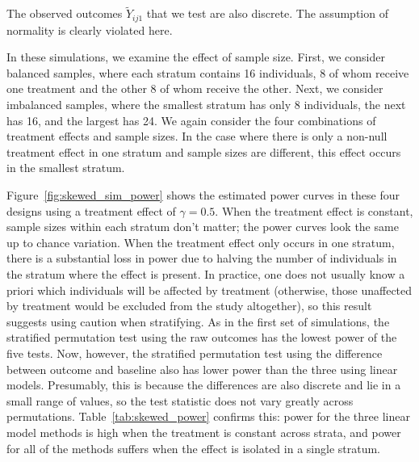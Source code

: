 \documentclass[11pt]{article}
\begin{document}
The observed outcomes $\tilde{Y}_{ij1}$ that we test are also discrete.
The assumption of normality is clearly violated here.

In these simulations, we examine the effect of sample size.
First, we consider balanced samples, where each stratum contains 16 individuals, 8 of whom receive one treatment and the other 8 of whom receive the other.
Next, we consider imbalanced samples, where the smallest stratum has only 8 individuals, the next has 16, and the largest has 24.
We again consider the four combinations of treatment effects and sample sizes.
In the case where there is only a non-null treatment effect in one stratum and sample sizes are different, this effect occurs in the smallest stratum.

Figure~\ref{fig:skewed_sim_power} shows the estimated power curves in these four designs using a treatment effect of $\gamma = 0.5$.
When the treatment effect is constant, sample sizes within each stratum don't matter; the power curves look the same up to chance variation.
When the treatment effect only occurs in one stratum, there is a substantial loss in power due to halving the number of individuals in the stratum where the effect is present.
In practice, one does not usually know a priori which individuals will be affected by treatment (otherwise, those unaffected by treatment would be excluded from the study altogether),
so this result suggests using caution when stratifying.
As in the first set of simulations, the stratified permutation test using the raw outcomes has the lowest power of the five tests.
Now, however, the stratified permutation test using the difference between outcome and baseline also has lower power than the three using linear models.
Presumably, this is because the differences are also discrete and lie in a small range of values, so the test statistic does not vary greatly across permutations.
Table~\ref{tab:skewed_power} confirms this: power for the three linear model methods is high when the treatment is constant across strata, and power for all of the methods suffers when the effect is isolated in a single stratum.
\end{document}

